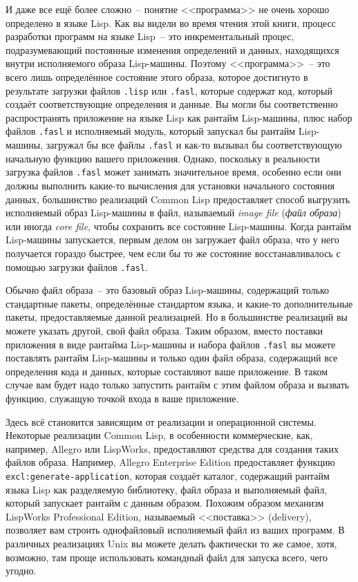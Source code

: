 И даже все ещё более сложно~-- понятие <<программа>> не очень хорошо определено в языке
Lisp. Как вы видели во время чтения этой книги, процесс разработки программ на языке
Lisp~-- это инкрементальный процес, подразумевающий постоянные изменения определений и
данных, находящихся внутри исполняемого образа Lisp-машины. Поэтому <<программа>>~-- это
всего лишь определённое состояние этого образа, которое достигнуто в результате загрузки
файлов \lstinline{.lisp} или \lstinline{.fasl}, которые содержат код, который создаёт
соответствующие определения и данные. Вы могли бы соответственно распространять приложение
на языке Lisp как рантайм Lisp-машины, плюс набор файлов \lstinline{.fasl} и исполняемый
модуль, который запускал бы рантайм Lisp-машины, загружал бы все файлы \lstinline{.fasl} и
как-то вызывал бы соответствующую начальную функцию вашего приложения. Однако, поскольку в
реальности загрузка файлов \lstinline{.fasl} может занимать значительное время, особенно если
они должны выполнить какие-то вычисления для установки начального состояния данных,
большинство реализаций Common Lisp предоставляет способ выгрузить исполняемый образ
Lisp-машины в файл, называемый \emph{image file} (\emph{файл образа}) или иногда
\emph{core file}, чтобы сохранить все состояние Lisp-машины. Когда рантайм Lisp-машины
запускается, первым делом он загружает файл образа, что у него получается гораздо быстрее,
чем если бы то же состояние восстанавливалось с помощью загрузки файлов \lstinline{.fasl}.

Обычно файл образа~-- это базовый образ Lisp-машины, содержащий только стандартные пакеты,
определённые стандартом языка, и какие-то дополнительные пакеты, предоставляемые данной
реализацией. Но в большинстве реализаций вы можете указать другой, свой файл образа. Таким
образом, вместо поставки приложения в виде рантайма Lisp-машины и набора файлов
\lstinline{.fasl} вы можете поставлять рантайм Lisp-машины и только один файл образа,
содержащий все определения кода и данных, которые составляют ваше приложение. В таком
случае вам будет надо только запустить рантайм с этим файлом образа и вызвать функцию,
служащую точкой входа в ваше приложение.

Здесь всё становится зависящим от реализации и операционной системы. Некоторые реализации
Common Lisp, в особенности коммерческие, как, например, Allegro или LispWorks, предоставляют
средства для создания таких файлов образа. Например, Allegro Enterprise Edition
предоставляет функцию \lstinline{excl:generate-application}, которая создаёт каталог,
содержащий рантайм языка Lisp как разделяемую библиотеку, файл образа и выполняемый файл,
который запускает рантайм с данным образом. Похожим образом механизм LispWorks
Professional Edition, называемый <<поставка>> (delivery), позволяет вам строить
однофайловый исполняемый файл из ваших программ. В различных реализациях Unix вы можете
делать фактически то же самое, хотя, возможно, там проще использовать командный файл для
запуска всего, чего угодно.

